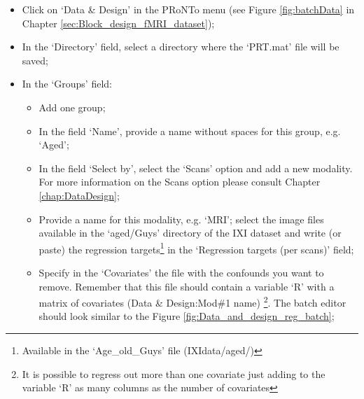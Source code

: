 \begin{itemize}

 	\item Click on `Data \& Design' in the PRoNTo menu (see Figure \ref{fig:batchData} in Chapter \ref{sec:Block_design_fMRI_dataset});	
	\item In the `Directory' field, select a directory where the `PRT.mat' file will be saved;
	
	\item In the `Groups' field:
 	
		\begin{itemize}
		
		\item Add one group;
		
		\item In the field `Name', provide a name without spaces for this group, e.g. `Aged';
		
		\item In the field `Select by', select the `Scans' option and add a new modality. For more information on the Scans option please consult Chapter \ref{chap:DataDesign};
		
		\item Provide a name for this modality, e.g. `MRI'; select the image files available in the `aged/Guys' directory of the IXI dataset and write (or paste) the regression targets\footnote{Available in the `Age\_old\_Guys' file (IXIdata/aged/)} in the `Regression targets (per scans)' field;
		
		\item Specify in the `Covariates' the file with the confounds you want to remove. Remember that this file should contain a variable `R' with a matrix of covariates (Data \& Design:Mod\#1 name) \footnote {It is possible to regress out more than one covariate just adding to the variable `R' as many columns as the number of covariates }. The batch editor should look similar to the Figure \ref{fig:Data_and_design_reg_batch};
		

\end{itemize}
\end{itemize}
